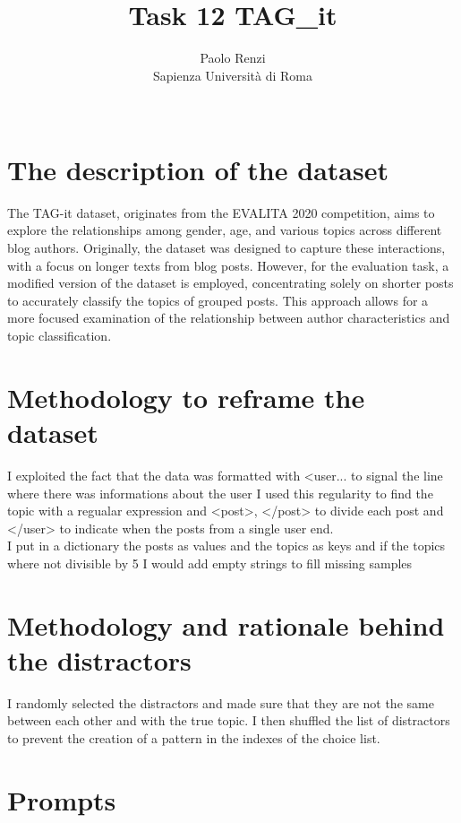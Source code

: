 \documentclass[11pt]{article}
\title{Task 12 TAG\_it}
\author{Paolo Renzi \\
  Sapienza Università di Roma\\\
  }
\begin{document}
\maketitle

\section{The description of the dataset}

The TAG-it dataset, originates from the EVALITA 2020 competition, aims to explore the relationships among gender, 
age, and various topics across different blog authors. Originally, the dataset was designed to capture these interactions, 
with a focus on longer texts from blog posts. However, for the evaluation task, a modified version of the dataset 
is employed, concentrating solely on shorter posts to accurately classify the topics of grouped posts. 
This approach allows for a more focused examination of the relationship between author characteristics and topic 
classification.


\section{Methodology to reframe the dataset}

I exploited the fact that the data was formatted with <user... to signal the line where there was informations 
about the user I used this regularity to find the topic with a regualar expression and <post>, </post> to divide 
each post and </user> to indicate when the posts from a single user end. \\
I put in a dictionary the posts as values and the topics as keys and if the topics where not divisible by 5 I would 
add empty strings to fill missing samples 

\section{Methodology and rationale behind the distractors}

I randomly selected the distractors and made sure that they are not the same between each other and with the true topic. 
I then shuffled the list of distractors to prevent the creation of a pattern in the indexes of the choice list.

\section{Prompts}
\end{document}

